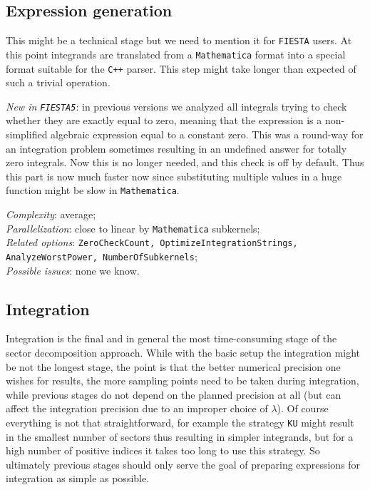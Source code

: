 \documentclass[preprint,12pt]{elsarticle}
\begin{document}
\subsection{Expression generation}

This might be a technical stage but we need to mention it for {\tt FIESTA} users. At this point integrands are translated from a {\tt Mathematica} format into a special format suitable for the {\tt C++} parser. This step might take longer than expected of such a trivial operation.

\textit{New in {\tt FIESTA5}}: in previous versions we analyzed all integrals trying to check whether they are exactly equal to zero, meaning that the expression is a non-simplified algebraic expression equal to a constant zero. This was a round-way for an integration problem sometimes resulting in an undefined answer for totally zero integrals. Now this is no longer needed, and this check is off by default. Thus this part is now much faster now since substituting multiple values in a huge function might be slow in {\tt Mathematica}.

\textit{Complexity}: average;\\\indent
\textit{Parallelization}: close to linear by {\tt Mathematica} subkernels;\\\indent
\textit{Related options}: {\tt ZeroCheckCount, OptimizeIntegrationStrings, \\AnalyzeWorstPower, NumberOfSubkernels};\\\indent
\textit{Possible issues}: none we know.

\subsection{Integration}

Integration is the final and in general the most time-consuming stage of the sector decomposition approach. While with the basic setup the integration might be not the longest stage, the point is that the better numerical precision one wishes for results, the more sampling points need to be taken during integration, while previous stages do not depend on the planned precision at all (but can affect the integration precision due to an improper choice of $\lambda$). Of course everything is not that straightforward, for example the strategy {\tt KU} might result in the smallest number of sectors thus resulting in simpler integrands, but for a high number of positive indices it takes too long to use this strategy. So ultimately previous stages should only serve the goal of preparing expressions for integration as simple as possible.
\end{document}
